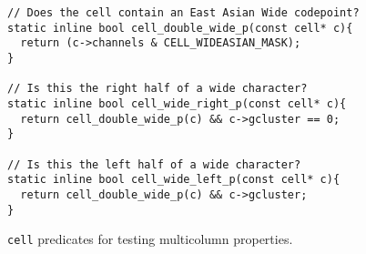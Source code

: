 \begin{listing}[!htb]
\begin{verbatim}
// Does the cell contain an East Asian Wide codepoint?
static inline bool cell_double_wide_p(const cell* c){
  return (c->channels & CELL_WIDEASIAN_MASK);
}

// Is this the right half of a wide character?
static inline bool cell_wide_right_p(const cell* c){
  return cell_double_wide_p(c) && c->gcluster == 0;
}

// Is this the left half of a wide character?
static inline bool cell_wide_left_p(const cell* c){
  return cell_double_wide_p(c) && c->gcluster;
}
\end{verbatim}
\caption{\texttt{cell} predicates for testing multicolumn properties.}
\label{list:widetests}
\end{listing}

